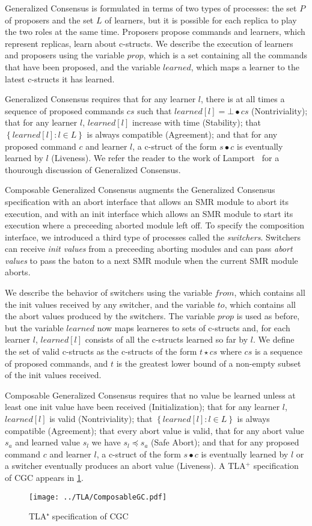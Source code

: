 Generalized Consensus is formulated in terms of two types of processes: the set $P$ of proposers and the set $L$ of learners, but it is possible for each replica to play the two roles at the same time. Proposers propose commands and learners, which represent replicas, learn about c-structs.
We describe the execution of learners and proposers using the variable $prop$, which is a set containing all the commands that have been proposed, and the variable $learned$, which maps a learner to the latest c-structs it has learned.

Generalized Consensus requires that for any learner $l$, there is at all times a sequence of proposed commands $cs$ such that $learned\left[l\right] = \bot \bullet cs$ (Nontriviality); that for any learner $l$, $learned\left[ l \right]$ increase with time (Stability); that $\left\{ learned\left[ l \right] :  l \in L\right\}$ is always compatible (Agreement); and that for any proposed command $c$ and learner $l$, a c-struct of the form $s\bullet c$ is eventually learned by $l$ (Liveness).
We refer the reader to the work of Lamport~\cite{Lamport05GeneralizeConsensus} for a thourough discussion of Generalized Consensus.

Composable Generalized Consensus augments the Generalized Consensus specification with an abort interface that allows an SMR module to abort its execution, and with an init interface which allows an SMR module to start its execution where a preceeding aborted module left off.
To specify the composition interface, we introduced a third type of processes called the \emph{switchers}. Switchers can receive \emph{init values} from a preceeding aborting modules and can pass \emph{abort values} to pass the baton to a next SMR module when the current SMR module aborts.

We describe the behavior of switchers using the variable $from$, which contains all the init values received by any switcher, and the variable $to$, which contains all the abort values produced by the switchers.
The variable $prop$ is used as before, but the variable $learned$ now maps learneres to sets of c-structs and, for each learner $l$, $learned\left[ l \right]$ consists of all the c-structs learned so far by $l$.
We define the set of valid c-structs as the c-structs of the form $t\star cs$ where $cs$ is a sequence of proposed commands, and $t$ is the greatest lower bound of a non-empty subset of the init values received.

Composable Generalized Consensus requires that no value be learned unless at least one init value have been received (Initialization); that for any learner $l$, $learned\left[ l \right]$ is valid (Nontriviality); that $\left\{ learned\left[ l \right] :  l \in L\right\}$ is always compatible (Agreement); that every abort value is valid, that for any abort value $s_a$ and learned value $s_l$ we have $s_l \preceq s_a$ (Safe Abort); and that for any proposed command $c$ and learner $l$, a c-struct
of the form $s\bullet c$ is eventually learned by $l$ or a switcher eventually produces an abort value (Liveness).
A TLA$^+$ specification of CGC appears in \cref{fig:cgc}.

\begin{figure}
\begin{minipage}[t]{.49\textwidth}
    \centering
    \texttt{[image: ../TLA/ComposableGC.pdf]}
    \caption{TLA$⁺$ specification of CGC}\label{fig:cgc}%
\end{minipage}\hfill
\end{figure}

